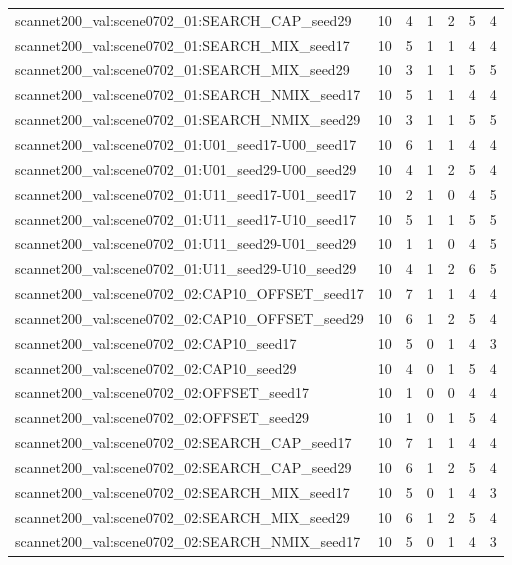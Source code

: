 \begin{table}[t]
\begin{tabular}{lrrrrrr}
scannet200\_val:scene0702\_01:SEARCH\_CAP\_seed29 & 10 & 4 & 1 & 2 & 5 & 4 \\
scannet200\_val:scene0702\_01:SEARCH\_MIX\_seed17 & 10 & 5 & 1 & 1 & 4 & 4 \\
scannet200\_val:scene0702\_01:SEARCH\_MIX\_seed29 & 10 & 3 & 1 & 1 & 5 & 5 \\
scannet200\_val:scene0702\_01:SEARCH\_NMIX\_seed17 & 10 & 5 & 1 & 1 & 4 & 4 \\
scannet200\_val:scene0702\_01:SEARCH\_NMIX\_seed29 & 10 & 3 & 1 & 1 & 5 & 5 \\
scannet200\_val:scene0702\_01:U01\_seed17-U00\_seed17 & 10 & 6 & 1 & 1 & 4 & 4 \\
scannet200\_val:scene0702\_01:U01\_seed29-U00\_seed29 & 10 & 4 & 1 & 2 & 5 & 4 \\
scannet200\_val:scene0702\_01:U11\_seed17-U01\_seed17 & 10 & 2 & 1 & 0 & 4 & 5 \\
scannet200\_val:scene0702\_01:U11\_seed17-U10\_seed17 & 10 & 5 & 1 & 1 & 5 & 5 \\
scannet200\_val:scene0702\_01:U11\_seed29-U01\_seed29 & 10 & 1 & 1 & 0 & 4 & 5 \\
scannet200\_val:scene0702\_01:U11\_seed29-U10\_seed29 & 10 & 4 & 1 & 2 & 6 & 5 \\
scannet200\_val:scene0702\_02:CAP10\_OFFSET\_seed17 & 10 & 7 & 1 & 1 & 4 & 4 \\
scannet200\_val:scene0702\_02:CAP10\_OFFSET\_seed29 & 10 & 6 & 1 & 2 & 5 & 4 \\
scannet200\_val:scene0702\_02:CAP10\_seed17 & 10 & 5 & 0 & 1 & 4 & 3 \\
scannet200\_val:scene0702\_02:CAP10\_seed29 & 10 & 4 & 0 & 1 & 5 & 4 \\
scannet200\_val:scene0702\_02:OFFSET\_seed17 & 10 & 1 & 0 & 0 & 4 & 4 \\
scannet200\_val:scene0702\_02:OFFSET\_seed29 & 10 & 1 & 0 & 1 & 5 & 4 \\
scannet200\_val:scene0702\_02:SEARCH\_CAP\_seed17 & 10 & 7 & 1 & 1 & 4 & 4 \\
scannet200\_val:scene0702\_02:SEARCH\_CAP\_seed29 & 10 & 6 & 1 & 2 & 5 & 4 \\
scannet200\_val:scene0702\_02:SEARCH\_MIX\_seed17 & 10 & 5 & 0 & 1 & 4 & 3 \\
scannet200\_val:scene0702\_02:SEARCH\_MIX\_seed29 & 10 & 6 & 1 & 2 & 5 & 4 \\
scannet200\_val:scene0702\_02:SEARCH\_NMIX\_seed17 & 10 & 5 & 0 & 1 & 4 & 3 \\

\end{tabular}
\end{table}
